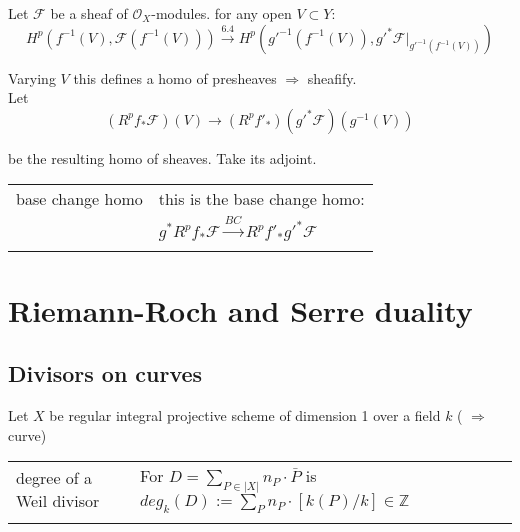 \documentclass[a4paper, 12pt]{article}
\newcommand{\caf}{\mathcal{F}}
\newcommand{\oxmods}{$\mathcal{O}_X$-modules}
\begin{document}
Let $\caf$ be a sheaf of \oxmods . for any open $V \subset Y$:
\[ H^p(f^{-1}(V) , \caf(f^{-1}(V))) \xrightarrow{6.4} H^p(g'^{-1}(f^{-1}(V)) , g'^* \caf|_{g'^{-1}(f^{-1}(V))}) \]


%
%
%
%
%
%
%
%



Varying $V$ this defines a homo of presheaves $\Rightarrow$ sheafify.\\

Let
\[
(R^pf_* \caf)(V) \longrightarrow (R^pf'_*)(g'^* \caf)(g^{-1}(V))
%
%
%
%
%
\]


be the resulting homo of sheaves. Take its adjoint.


\begin{longtable}{p{}  p{} }

  base change homo & this is the base change homo:\\

  & $g^*R^pf_* \caf \xrightarrow{BC} R^pf'_*g'^* \caf$\\

  &\\

    
\end{longtable}


\section{Riemann-Roch and Serre duality}

\subsection{Divisors on curves}

Let $X$ be regular integral projective scheme of dimension 1 over a field $k$ ( $\Rightarrow$ curve)\\


\begin{longtable}{p{}  p{} }

degree of a Weil divisor & For $D= \sum_{P \in |X|} n_P \cdot \bar{P}$ is $deg_k(D):= \sum_P n_P \cdot [k(P)/k] \in \mathbb{Z}$\\

&\\

\end{longtable}
\end{document}
